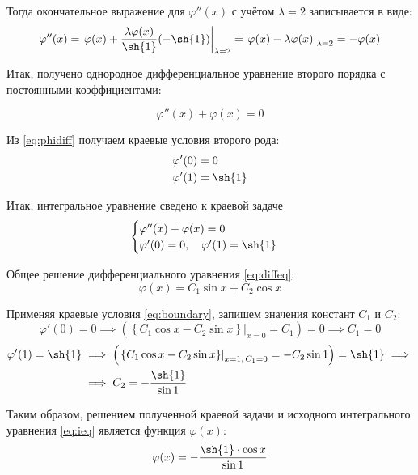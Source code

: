 \documentclass{article}
\numberwithin{equation}{section}
\renewcommand{\phi}{\varphi}
\providecommand{\at}[2]{\left. {#1}\right\vert_{#2}}
\begin{document}
Тогда окончательное выражение для $\phi''(x)$ с учётом $\lambda = 2$
записывается в виде:
\begin{equation}
  \label{eq:phi2diff}
  \phi''(x) = \at{\phi(x) + \frac{\lambda \phi(x)}{\sh{1}}(-\sh{1})}{\lambda=2} =
  \at{\phi(x) - \lambda \phi(x)}{\lambda=2} = -\phi(x)
\end{equation}

Итак, получено однородное дифференциальное уравнение второго порядка с
постоянными коэффициентами:

\begin{equation}
  \label{eq:diffeq}
  \phi''(x) + \phi(x) = 0
\end{equation}

Из \eqref{eq:phidiff} получаем краевые условия второго рода:
\begin{subequations}
  \label{eq:boundary}
  \begin{align}
    \phi'(0) &= 0 \\
    \phi'(1) &= \sh{1}
  \end{align}
\end{subequations}

Итак, интегральное уравнение сведено к краевой задаче
\begin{equation}
  \begin{cases}
    \phi''(x) + \phi(x) = 0\\
    \phi'(0) = 0, \quad \phi'(1) = \sh{1}
  \end{cases}
\end{equation}

Общее решение дифференциального уравнения \eqref{eq:diffeq}:
\begin{equation}
  \phi(x) = C_1 \sin{x} + C_2 \cos{x}
\end{equation}

Применяя краевые условия \eqref{eq:boundary}, запишем значения
констант $C_1$ и $C_2$:
\begin{equation*}
  \phi'(0) = 0 \implies
  \left( \at{\left \{ C_1 \cos{x} - C_2 \sin{x} \right \}}{x=0} =
    C_1 \right) = 0 \implies C_1 = 0
\end{equation*}
\begin{align*}
  \phi'(1) = \sh{1} &\implies
  \left( \at{\left \{ C_1 \cos{x} - C_2 \sin{x} \right
      \}}{x=1,\, C_1=0} = - C_2 \sin{1} \right) = \sh{1} \implies\\
  &\implies C_2 = -\frac{\sh{1}}{\sin{1}}
\end{align*}

Таким образом, решением полученной краевой задачи и исходного
интегрального уравнения \eqref{eq:ieq} является функция $\phi(x)$:
\begin{equation}
  \label{eq:solution}
  \phi(x) = -\frac{\sh{1} \cdot \cos{x}}{\sin{1}}
\end{equation}
\end{document}
